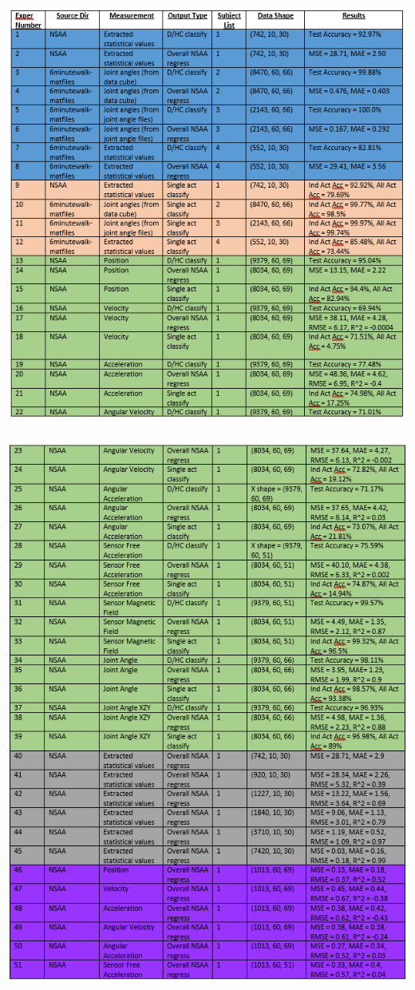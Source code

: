 \documentclass[12pt,twoside]{report}
\begin{document}
\begin{center}
\includegraphics[scale=1]{project_figures/fig10_3}
\end{center}

\begin{center}
\includegraphics[scale=1]{project_figures/fig10_4}
\end{center}
\end{document}
